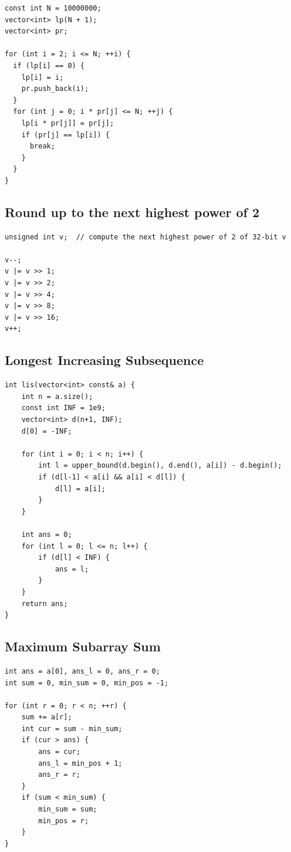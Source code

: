 \documentclass[10pt]{article}
\begin{document}
\begin{lstlisting}
const int N = 10000000;
vector<int> lp(N + 1);
vector<int> pr;

for (int i = 2; i <= N; ++i) {
  if (lp[i] == 0) {
    lp[i] = i;
    pr.push_back(i);
  }
  for (int j = 0; i * pr[j] <= N; ++j) {
    lp[i * pr[j]] = pr[j];
    if (pr[j] == lp[i]) {
      break;
    }
  }
}
\end{lstlisting}

\subsection{Round up to the next highest power of 2}

\begin{lstlisting}
unsigned int v;  // compute the next highest power of 2 of 32-bit v

v--;
v |= v >> 1;
v |= v >> 2;
v |= v >> 4;
v |= v >> 8;
v |= v >> 16;
v++;
\end{lstlisting}

\subsection{Longest Increasing Subsequence}

\begin{lstlisting}
int lis(vector<int> const& a) {
    int n = a.size();
    const int INF = 1e9;
    vector<int> d(n+1, INF);
    d[0] = -INF;

    for (int i = 0; i < n; i++) {
        int l = upper_bound(d.begin(), d.end(), a[i]) - d.begin();
        if (d[l-1] < a[i] && a[i] < d[l]) {
            d[l] = a[i];
        }
    }

    int ans = 0;
    for (int l = 0; l <= n; l++) {
        if (d[l] < INF) {
            ans = l;
        }
    }
    return ans;
}
\end{lstlisting}

\subsection{Maximum Subarray Sum}

\begin{lstlisting}
int ans = a[0], ans_l = 0, ans_r = 0;
int sum = 0, min_sum = 0, min_pos = -1;

for (int r = 0; r < n; ++r) {
    sum += a[r];
    int cur = sum - min_sum;
    if (cur > ans) {
        ans = cur;
        ans_l = min_pos + 1;
        ans_r = r;
    }
    if (sum < min_sum) {
        min_sum = sum;
        min_pos = r;
    }
}
\end{lstlisting}
\end{document}
